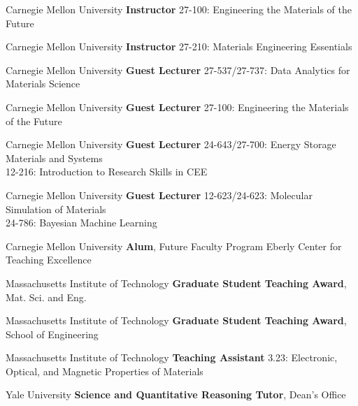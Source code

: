 \vspace{-1mm}
    {Carnegie Mellon University}
    {\textbf{Instructor}}
    {27-100: Engineering the Materials of the Future}

\vspace{-2mm}
    {Carnegie Mellon University}
    {\textbf{Instructor}}
    {27-210: Materials Engineering Essentials}

\vspace{-2mm}
\datedsubsection{}
    {Carnegie Mellon University}
    {\textbf{Guest Lecturer}}
    {27-537/27-737: Data Analytics for Materials Science}

\vspace{-2mm}
    {Carnegie Mellon University}
    {\textbf{Guest Lecturer}}
    {27-100: Engineering the Materials of the Future}

\vspace{-2mm}
    {Carnegie Mellon University}
    {\textbf{Guest Lecturer}}
    {24-643/27-700: Energy Storage Materials and Systems\\
    12-216: Introduction to Research Skills in CEE}

\vspace{-2mm}
    {Carnegie Mellon University}
    {\textbf{Guest Lecturer}}
    {12-623/24-623: Molecular Simulation of Materials\\
    24-786: Bayesian Machine Learning}

\vspace{-2mm}
    {Carnegie Mellon University}
    {\textbf{Alum}, Future Faculty Program}
    {Eberly Center for Teaching Excellence}

\newpage
{}
    {Massachusetts Institute of Technology}
    {\textbf{Graduate Student Teaching Award}, Mat. Sci. and Eng.}{}

\datedsubsectionnarrow{}
    {Massachusetts Institute of Technology}
    {\textbf{Graduate Student Teaching Award}, School of Engineering}{}

\vspace{-2mm}
    {Massachusetts Institute of Technology}
    {\textbf{Teaching Assistant}}
    {3.23: Electronic, Optical, and Magnetic Properties of Materials}

\vspace{2.2mm}
    {Yale University}
    {\textbf{Science and Quantitative Reasoning Tutor}, Dean's Office}{}
